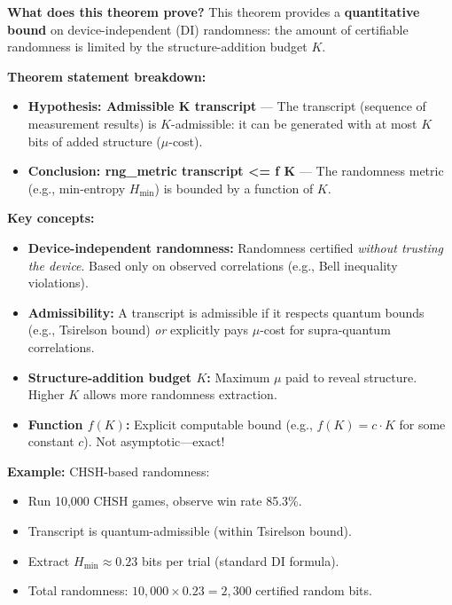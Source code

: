 \textbf{What does this theorem prove?} This theorem provides a \textbf{quantitative bound} on device-independent (DI) randomness: the amount of certifiable randomness is limited by the structure-addition budget $K$.

\textbf{Theorem statement breakdown:}
\begin{itemize}
    \item \textbf{Hypothesis: Admissible K transcript} — The transcript (sequence of measurement results) is $K$-admissible: it can be generated with at most $K$ bits of added structure ($\mu$-cost).
    
    \item \textbf{Conclusion: rng\_metric transcript <= f K} — The randomness metric (e.g., min-entropy $H_{\min}$) is bounded by a function of $K$.
\end{itemize}

\textbf{Key concepts:}
\begin{itemize}
    \item \textbf{Device-independent randomness:} Randomness certified \textit{without trusting the device}. Based only on observed correlations (e.g., Bell inequality violations).
    
    \item \textbf{Admissibility:} A transcript is admissible if it respects quantum bounds (e.g., Tsirelson bound) \textit{or} explicitly pays $\mu$-cost for supra-quantum correlations.
    
    \item \textbf{Structure-addition budget $K$:} Maximum $\mu$ paid to reveal structure. Higher $K$ allows more randomness extraction.
    
    \item \textbf{Function $f(K)$:} Explicit computable bound (e.g., $f(K) = c \cdot K$ for some constant $c$). Not asymptotic---exact!
\end{itemize}

\textbf{Example:} CHSH-based randomness:
\begin{itemize}
    \item Run 10,000 CHSH games, observe win rate 85.3\%.
    \item Transcript is quantum-admissible (within Tsirelson bound).
    \item Extract $H_{\min} \approx 0.23$ bits per trial (standard DI formula).
    \item Total randomness: $10,000 \times 0.23 = 2,300$ certified random bits.
\end{itemize}

